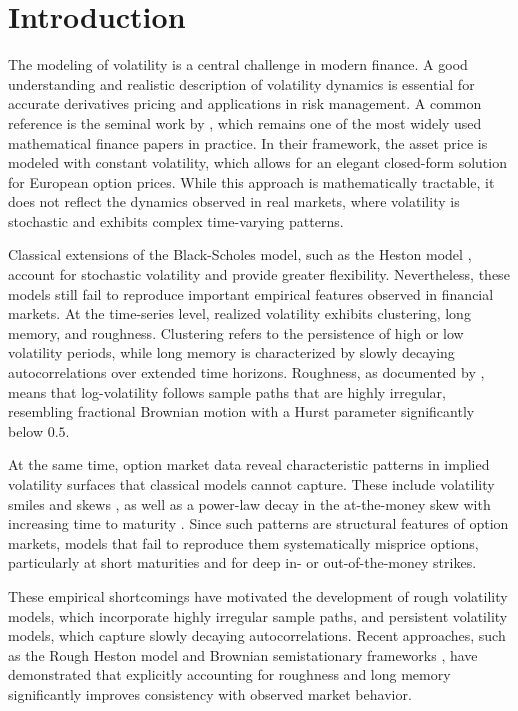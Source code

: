 \section{Introduction} \label{sec:Introduction}

The modeling of volatility is a central challenge in modern finance. A good understanding and realistic description of volatility dynamics is essential for accurate derivatives pricing and applications in risk management. A common reference is the seminal work by \cite{BlackScholes1973}, which remains one of the most widely used mathematical finance papers in practice. In their framework, the asset price is modeled with constant volatility, which allows for an elegant closed-form solution for European option prices. While this approach is mathematically tractable, it does not reflect the dynamics observed in real markets, where volatility is stochastic and exhibits complex time-varying patterns.

Classical extensions of the Black-Scholes model, such as the Heston model \citep{Heston1993}, account for stochastic volatility and provide greater flexibility. Nevertheless, these models still fail to reproduce important empirical features observed in financial markets. At the time-series level, realized volatility exhibits clustering, long memory, and roughness. Clustering refers to the persistence of high or low volatility periods, while long memory is characterized by slowly decaying autocorrelations over extended time horizons. Roughness, as documented by \cite{GatheralJaissonRosenbaum2018}, means that log-volatility follows sample paths that are highly irregular, resembling fractional Brownian motion with a Hurst parameter significantly below $0.5$.

At the same time, option market data reveal characteristic patterns in implied volatility surfaces that classical models cannot capture. These include volatility smiles and skews \citep{Rubinstein1985}, as well as a power-law decay in the at-the-money skew with increasing time to maturity \citep{GatheralJaissonRosenbaum2018}. Since such patterns are structural features of option markets, models that fail to reproduce them systematically misprice options, particularly at short maturities and for deep in- or out-of-the-money strikes.

These empirical shortcomings have motivated the development of rough volatility models, which incorporate highly irregular sample paths, and persistent volatility models, which capture slowly decaying autocorrelations. Recent approaches, such as the Rough Heston model \citep{ElEuchRosenbaum2019} and Brownian semistationary frameworks \citep{BennedsenLundePakkanen2021}, have demonstrated that explicitly accounting for roughness and long memory significantly improves consistency with observed market behavior.

